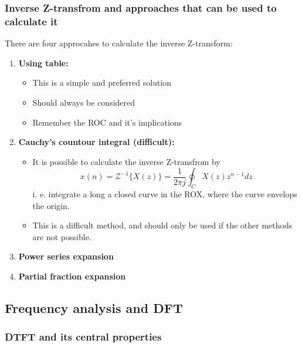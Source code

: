 \documentclass{article}
\begin{document}
\clearpage
\subsubsection{Inverse Z-transfrom and approaches that can be used to calculate it}
There are four approcahes to calculate the inverse Z-transform:
\begin{enumerate}
    \item \textbf{Using table:} 
    \begin{itemize}
        \item This is a simple and preferred solution
        \item Should always be considered
        \item Remember the ROC and it's implications
    \end{itemize}
    \item \textbf{Cauchy's countour integral (difficult):}
    \begin{itemize}
        \item It is possible to calculate the inverse Z-transfrom by
        \begin{equation}
            x(n) = \mathcal{Z}^{-1}\{X(z)\} = \frac{1}{2\pi j} \oint_C X(z)z^{n-1}dz
        \end{equation}
        i. e. integrate a long a closed curve in the ROX, where the curve envelops the origin.
        \item This is a difficult method, and should only be used if the other methods are not possible.
    \end{itemize}
    \item \textbf{Power series expansion}
    \item \textbf{Partial fraction expansion}
\end{enumerate}

\clearpage

\subsection{Frequency analysis and DFT}

\subsubsection{DTFT and its central properties}
\end{document}
